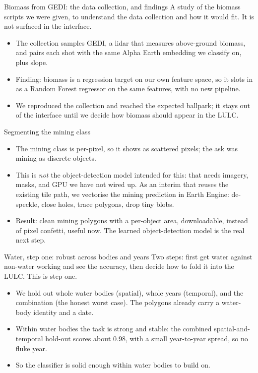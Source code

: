 \documentclass[aspectratio=169]{beamer}
\begin{document}
\begin{frame}{Biomass from GEDI: the data collection, and findings}
A study of the biomass scripts we were given, to understand the data collection and how it would fit.
It is not surfaced in the interface.
\begin{itemize}\small
  \item The collection samples GEDI, a lidar that measures above-ground biomass, and pairs each shot
  with the same Alpha Earth embedding we classify on, plus slope.
  \item Finding: biomass is a regression target on our own feature space, so it slots in as a Random
  Forest regressor on the same features, with no new pipeline.
  \item We reproduced the collection and reached the expected ballpark; it stays out of the interface
  until we decide how biomass should appear in the LULC.
\end{itemize}
\end{frame}

\begin{frame}{Segmenting the mining class}
\begin{itemize}
  \item The mining class is per-pixel, so it shows as scattered pixels; the ask was mining as discrete
  objects.
  \item This is \emph{not} the object-detection model intended for this: that needs imagery, masks, and
  GPU we have not wired up. As an interim that reuses the existing tile path, we vectorise the mining
  prediction in Earth Engine: de-speckle, close holes, trace polygons, drop tiny blobs.
  \item Result: clean mining polygons with a per-object area, downloadable, instead of pixel confetti,
  useful now. The learned object-detection model is the real next step.
\end{itemize}
\end{frame}

\begin{frame}{Water, step one: robust across bodies and years}
Two steps: first get water against non-water working and see the accuracy, then decide how to fold it
into the LULC. This is step one.
\begin{itemize}\small
  \item We hold out whole water bodies (spatial), whole years (temporal), and the combination (the
  honest worst case). The polygons already carry a water-body identity and a date.
  \item Within water bodies the task is strong and stable: the combined spatial-and-temporal hold-out
  scores about 0.98, with a small year-to-year spread, so no fluke year.
  \item So the classifier is solid enough within water bodies to build on.
\end{itemize}
\end{frame}
\end{document}
